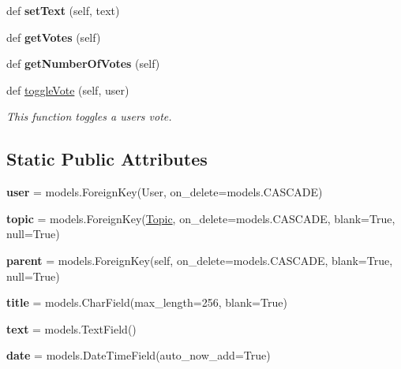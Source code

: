 \begin{DoxyCompactItemize}
def {\bfseries set\+Text} (self, text)
\item 
\mbox{\label{classforum_1_1models_1_1_post_afa4996b65c33466db7a26de2dc74b654}} 
def {\bfseries get\+Votes} (self)
\item 
\mbox{\label{classforum_1_1models_1_1_post_a456d57650a6f3471b4d49137c0cb108e}} 
def {\bfseries get\+Number\+Of\+Votes} (self)
\item 
def \mbox{\hyperlink{classforum_1_1models_1_1_post_ad4ec8bc0d7695b437af426923c4d18fa}{toggle\+Vote}} (self, user)
\begin{DoxyCompactList}\small\item\em This function toggles a user\textquotesingle{}s vote. \end{DoxyCompactList}\end{DoxyCompactItemize}
\subsection*{Static Public Attributes}
\begin{DoxyCompactItemize}
\item 
\mbox{\label{classforum_1_1models_1_1_post_a5136d689515d6a6a54eb13b36b9b3f59}} 
{\bfseries user} = models.\+Foreign\+Key(User, on\+\_\+delete=models.\+C\+A\+S\+C\+A\+DE)
\item 
\mbox{\label{classforum_1_1models_1_1_post_abca8651b34e73869314e8d4675c6d1a3}} 
{\bfseries topic} = models.\+Foreign\+Key(\mbox{\hyperlink{classforum_1_1models_1_1_topic}{Topic}}, on\+\_\+delete=models.\+C\+A\+S\+C\+A\+DE, blank=True, null=True)
\item 
\mbox{\label{classforum_1_1models_1_1_post_a0012414ecd8600c939fa96f39545e4d7}} 
{\bfseries parent} = models.\+Foreign\+Key(\textquotesingle{}self\textquotesingle{}, on\+\_\+delete=models.\+C\+A\+S\+C\+A\+DE, blank=True, null=True)
\item 
\mbox{\label{classforum_1_1models_1_1_post_a62748560a49f6be1a462bc5a5b85ccdf}} 
{\bfseries title} = models.\+Char\+Field(max\+\_\+length=256, blank=True)
\item 
\mbox{\label{classforum_1_1models_1_1_post_af24d69d120754653de95f4b02481a97c}} 
{\bfseries text} = models.\+Text\+Field()
\item 
\mbox{\label{classforum_1_1models_1_1_post_a5fc04f7e66116c02ff43a7bd1f62f306}} 
{\bfseries date} = models.\+Date\+Time\+Field(auto\+\_\+now\+\_\+add=True)
\end{DoxyCompactItemize}


